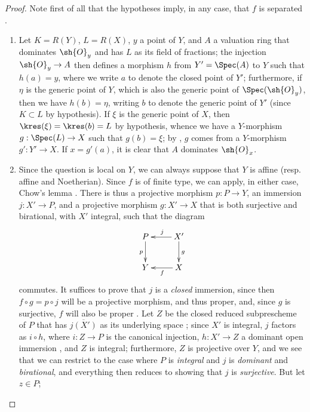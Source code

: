 \begin{proof}
Note first of all that the hypotheses imply, in any case, that $f$ is separated .
\begin{enumerate}
    \item[\rm{(i)}] Let $K=R(Y)$, $L=R(X)$, $y$ a point of $Y$, and $A$ a valuation ring that dominates $\sh{O}_y$ and has $L$ as its field of fractions;
        the injection $\sh{O}_y\to A$ then defines a morphism $h$ from $Y'=\Spec(A)$ to $Y$  such that $h(a)=y$, where we write $a$ to denote the closed point of $Y'$;
        furthermore, if $\eta$ is the generic point of $Y$, which is also the generic point of $\Spec(\sh{O}_y)$, then we have $h(b)=\eta$, writing $b$ to denote the generic point of $Y'$ (since $K\subset L$ by hypothesis).
        If $\xi$ is the generic point of $X$, then $\kres(\xi)=\kres(b)=L$ by hypothesis, whence we have a $Y$-morphism $g:\Spec(L)\to X$ such that $g(b)=\xi$;
        by , $g$ comes from a $Y$-morphism $g':Y'\to X$.
        If $x=g'(a)$, it is clear that $A$ dominates $\sh{O}_x$.
    \item[\rm{(ii)}] Since the question is local on $Y$, we can always suppose that $Y$ is affine (resp. affine and Noetherian).
        Since $f$ is of finite type, we can apply, in either case, Chow's lemma .
        There is thus a projective morphism $p:P\to Y$, an immersion $j:X'\to P$, and a projective morphism $g:X'\to X$ that is both surjective and birational, with $X'$ integral, such that the diagram
        \[
            \xymatrix{
                P \ar[d]_p
                & X' \ar[l]_j \ar[d]^g
            \\  Y
                & X \ar[l]^f
            }
        \]
        commutes.
        It suffices to prove that $j$ is a \emph{closed} immersion, since then $f\circ g=p\circ j$ will be a projective morphism, and thus proper, and, since $g$ is surjective, $f$ will also be proper .
        Let $Z$ be the closed reduced subprescheme of $P$ that has $\overline{j(X')}$ as its underlying space ;
        since $X'$ is integral, $j$ factors as $i\circ h$, where $i:Z\to P$ is the canonical injection, $h:X'\to Z$ a dominant open immersion , and $Z$ is integral;
        furthermore, $Z$ is projective over $Y$, and we see that we can restrict to the case where $P$ is \emph{integral} and $j$ is \emph{dominant} and \emph{birational}, and everything then reduces to showing that $j$ is \emph{surjective}.
        But let $z\in P$;

\end{enumerate}
\end{proof}
